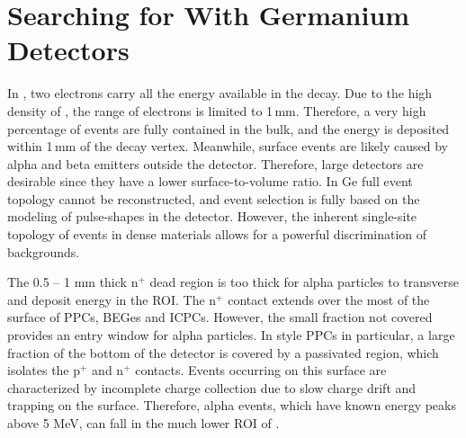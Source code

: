 \section{Searching for \novbb{} With Germanium Detectors} \label{sec:bg_disc}

In \novbb{}, two electrons carry all the energy available in the decay. Due to the high density of \geEn{}, the range of electrons is limited to 1\,mm. Therefore, a very high percentage of events are fully contained in the bulk, and the energy is deposited within 1\,mm of the decay vertex. Meanwhile, surface events are likely caused by alpha and beta emitters outside the detector. Therefore, large detectors are desirable since they have a lower surface-to-volume ratio. In Ge full event topology cannot be reconstructed, and event selection is fully based on the modeling of pulse-shapes in the detector. However, the inherent single-site topology of \novbb{} events in dense materials allows for a powerful discrimination of backgrounds.

The 0.5 -- 1 mm thick n$^+$ dead region is too thick for alpha particles to transverse and deposit energy in the ROI. The n$^+$ contact extends over the most of the surface of PPCs, BEGes and ICPCs. However, the small fraction not covered provides an entry window for alpha particles. In {\MJMit} style PPCs in particular, a large fraction of the bottom of the detector is covered by a passivated region, which isolates the p$^+$ and n$^+$ contacts. Events occurring on this surface are characterized by incomplete charge collection due to slow charge drift and trapping on the surface. Therefore, alpha events, which have known energy peaks above 5 MeV, can fall in the much lower ROI of \novbb{}.

